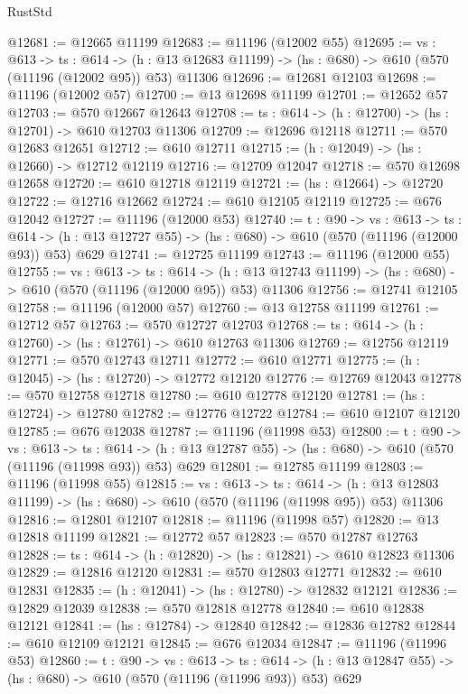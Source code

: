 \begin{lexlean}{RustStd}
\begin{coremodule}
@12681 := @12665 @11199
@12683 := @11196 (@12002 @55)
@12695 := {vs : @613} ->
  {ts : @614} ->
  (h : @13 @12683 @11199) -> (hs : @680) -> @610 (@570 (@11196 (@12002 @95)) @53) @11306
@12696 := @12681 @12103
@12698 := @11196 (@12002 @57)
@12700 := @13 @12698 @11199
@12701 := @12652 @57
@12703 := @570 @12667 @12643
@12708 := {ts : @614} -> (h : @12700) -> (hs : @12701) -> @610 @12703 @11306
@12709 := @12696 @12118
@12711 := @570 @12683 @12651
@12712 := @610 @12711
@12715 := (h : @12049) -> (hs : @12660) -> @12712 @12119
@12716 := @12709 @12047
@12718 := @570 @12698 @12658
@12720 := @610 @12718 @12119
@12721 := (hs : @12664) -> @12720
@12722 := @12716 @12662
@12724 := @610 @12105 @12119
@12725 := @676 @12042
@12727 := @11196 (@12000 @53)
@12740 := {t : @90} ->
  {vs : @613} ->
  {ts : @614} -> (h : @13 @12727 @55) -> (hs : @680) -> @610 (@570 (@11196 (@12000 @93)) @53) @629
@12741 := @12725 @11199
@12743 := @11196 (@12000 @55)
@12755 := {vs : @613} ->
  {ts : @614} ->
  (h : @13 @12743 @11199) -> (hs : @680) -> @610 (@570 (@11196 (@12000 @95)) @53) @11306
@12756 := @12741 @12105
@12758 := @11196 (@12000 @57)
@12760 := @13 @12758 @11199
@12761 := @12712 @57
@12763 := @570 @12727 @12703
@12768 := {ts : @614} -> (h : @12760) -> (hs : @12761) -> @610 @12763 @11306
@12769 := @12756 @12119
@12771 := @570 @12743 @12711
@12772 := @610 @12771
@12775 := (h : @12045) -> (hs : @12720) -> @12772 @12120
@12776 := @12769 @12043
@12778 := @570 @12758 @12718
@12780 := @610 @12778 @12120
@12781 := (hs : @12724) -> @12780
@12782 := @12776 @12722
@12784 := @610 @12107 @12120
@12785 := @676 @12038
@12787 := @11196 (@11998 @53)
@12800 := {t : @90} ->
  {vs : @613} ->
  {ts : @614} -> (h : @13 @12787 @55) -> (hs : @680) -> @610 (@570 (@11196 (@11998 @93)) @53) @629
@12801 := @12785 @11199
@12803 := @11196 (@11998 @55)
@12815 := {vs : @613} ->
  {ts : @614} ->
  (h : @13 @12803 @11199) -> (hs : @680) -> @610 (@570 (@11196 (@11998 @95)) @53) @11306
@12816 := @12801 @12107
@12818 := @11196 (@11998 @57)
@12820 := @13 @12818 @11199
@12821 := @12772 @57
@12823 := @570 @12787 @12763
@12828 := {ts : @614} -> (h : @12820) -> (hs : @12821) -> @610 @12823 @11306
@12829 := @12816 @12120
@12831 := @570 @12803 @12771
@12832 := @610 @12831
@12835 := (h : @12041) -> (hs : @12780) -> @12832 @12121
@12836 := @12829 @12039
@12838 := @570 @12818 @12778
@12840 := @610 @12838 @12121
@12841 := (hs : @12784) -> @12840
@12842 := @12836 @12782
@12844 := @610 @12109 @12121
@12845 := @676 @12034
@12847 := @11196 (@11996 @53)
@12860 := {t : @90} ->
  {vs : @613} ->
  {ts : @614} -> (h : @13 @12847 @55) -> (hs : @680) -> @610 (@570 (@11196 (@11996 @93)) @53) @629

\end{coremodule}
\end{lexlean}

